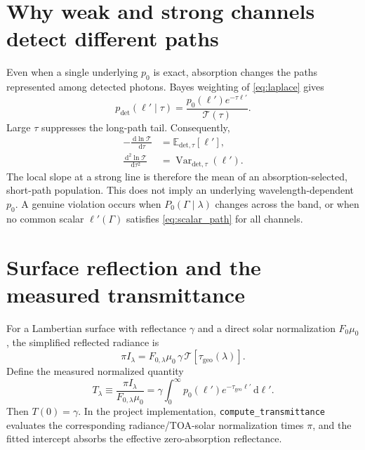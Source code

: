 \documentclass[11pt]{article}
\newcommand{\dd}{\,\mathrm{d}}
\newcommand{\E}{\mathbb{E}}
\newcommand{\Var}{\operatorname{Var}}
\newcommand{\taugeo}{\tau_{\mathrm{geo}}}
\newcommand{\lp}{\ell'}
\begin{document}
\section{Why weak and strong channels detect different paths}

Even when a single underlying $p_0$ is exact, absorption changes the paths
represented among detected photons.  Bayes weighting of \cref{eq:laplace}
gives
\begin{equation}
  p_{\mathrm{det}}(\lp\mid\tau)
  = \frac{p_0(\lp)e^{-\tau\lp}}
         {\mathcal T(\tau)}.
  \label{eq:detected_pdf}
\end{equation}
Large $\tau$ suppresses the long-path tail.  Consequently,
\begin{align}
  -\frac{\dd\ln\mathcal T}{\dd\tau}
    &= \E_{\mathrm{det},\tau}[\lp],
    \label{eq:local_mean}\\
  \frac{\dd^2\ln\mathcal T}{\dd\tau^2}
    &= \Var_{\mathrm{det},\tau}(\lp).
    \label{eq:local_variance}
\end{align}
The local slope at a strong line is therefore the mean of an
absorption-selected, short-path population.  This does not imply an underlying
wavelength-dependent $p_0$.  A genuine violation occurs when
$P_0(\Gamma\mid\lambda)$ changes across the band, or when no common scalar
$\lp(\Gamma)$ satisfies \cref{eq:scalar_path} for all channels.

\section{Surface reflection and the measured transmittance}

For a Lambertian surface with reflectance $\gamma$ and a direct solar
normalization $F_0\mu_0$, the simplified reflected radiance is
\begin{equation}
  \pi I_\lambda
  = F_{0,\lambda}\mu_0\,\gamma\,
    \mathcal T[\taugeo(\lambda)].
  \label{eq:radiance}
\end{equation}
Define the measured normalized quantity
\begin{equation}
  T_\lambda
  \equiv \frac{\pi I_\lambda}{F_{0,\lambda}\mu_0}
  = \gamma\int_0^\infty p_0(\lp)e^{-\taugeo\lp}\dd\lp.
  \label{eq:measured_T}
\end{equation}
Then $T(0)=\gamma$.  In the project implementation,
\texttt{compute\_transmittance} evaluates the corresponding radiance/TOA-solar
normalization times $\pi$, and the fitted intercept absorbs the effective
zero-absorption reflectance.
\end{document}
